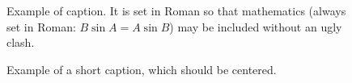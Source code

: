 \documentclass[10pt,twocolumn,letterpaper]{article}
\begin{document}
\begin{figure}[t]
\begin{center}
\fbox{\rule{0pt}{2in} \rule{0.9\linewidth}{0pt}}
\end{center}
   \caption{Example of caption.  It is set in Roman so that mathematics
   (always set in Roman: $B \sin A = A \sin B$) may be included without an
   ugly clash.}
\label{fig:long}
\label{fig:onecol}
\end{figure}

\begin{figure*}
\begin{center}
\fbox{\rule{0pt}{2in} \rule{.9\linewidth}{0pt}}
\end{center}
   \caption{Example of a short caption, which should be centered.}
\label{fig:short}
\end{figure*}

{\small


}
\end{document}
